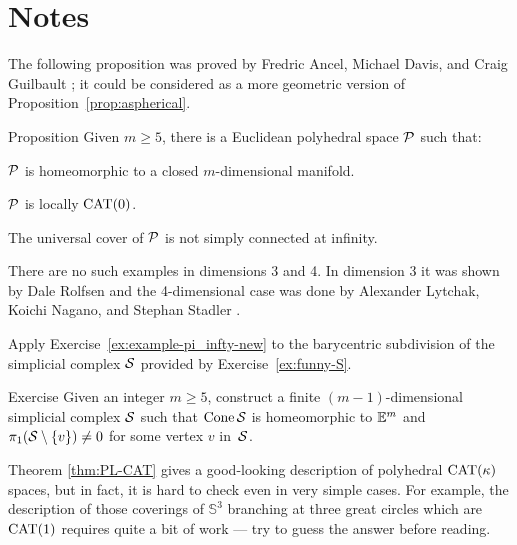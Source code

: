\section{Notes}

The following proposition was proved by
Fredric Ancel, 
Michael Davis,
and Craig Guilbault \cite{ancel-davis-guilbault};
it could be considered as a more geometric version of Proposition~\ref{prop:aspherical}.

\begin{thm}{Proposition}\label{prop:loc-CAT-mnfld}
Given $m\ge 5$, there is a Euclidean polyhedral space $\mathcal{P}$ such that:
\begin{subthm}{}
$\mathcal{P}$ is homeomorphic to a closed $m$-dimensional manifold.
\end{subthm}

\begin{subthm}{}
$\mathcal{P}$ is locally $\mathrm{CAT}(0)$.
\end{subthm}

\begin{subthm}{}
The universal cover of $\mathcal{P}$ is not simply connected at infinity.
\end{subthm}
\end{thm}

There are no such examples in dimensions 3 and 4.
In dimension 3 it was shown by
Dale Rolfsen \cite{rolfsen}
and the 4-dimensional case was done by
Alexander Lytchak,
Koichi Nagano,
and Stephan Stadler
\cite{lytchak-nagano-stadler}.

Apply Exercise~\ref{ex:example-pi_infty-new} to the barycentric subdivision of the simplicial complex $\mathcal{S}$ provided by Exercise~\ref{ex:funny-S}.
\qeds

\begin{thm}[!]{Exercise}\label{ex:funny-S}
Given an integer $m\ge 5$,
construct a finite $(m-1)$-dimensional simplicial complex $\mathcal{S}$ such that $\mathop{\rm Cone}\nolimits\mathcal{S}$ is homeomorphic to $\mathbb{E}^m$
and $\pi_1(\mathcal{S}\setminus\{v\})\ne0$ for some vertex $v$ in~$\mathcal{S}$.
\end{thm} 

Theorem \ref{thm:PL-CAT} gives a good-looking description of polyhedral $\mathrm{CAT}(\kappa)$ spaces,
but in fact, it is hard to check even in very simple cases.
For example, the description of those coverings of $\mathbb{S}^3$ branching at three 
great circles which are $\mathrm{CAT}(1)$ requires quite a bit of work \cite{charney-davis-1993} --- try to guess the answer before reading.


